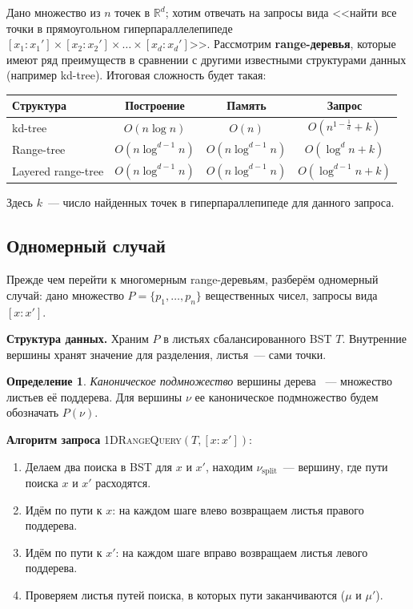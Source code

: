 \documentclass[12pt, a4paper]{article}
\theoremstyle{definition}
\newtheorem*{definition}{Определение}
\theoremstyle{plain}
\theoremstyle{remark}
\begin{document}
Дано множество из $n$ точек в $\mathbb{R}^d$; хотим отвечать на
запросы вида <<найти все точки в прямоугольном гиперпараллелепипеде $[x_1:x_1'] \times [x_2: x_2'] \times \ldots \times [x_d: x_d']$>>. Рассмотрим \textbf{range-деревья}, которые имеют ряд преимуществ в сравнении с другими известными структурами данных (например kd-tree). Итоговая сложность будет такая:

\begin{center}
\begin{tabular}{l|c|c|c}
Структура & Построение & Память & Запрос \\
\hline
kd-tree & $O(n\log n)$ & $O(n)$ & $O(n^{1-\frac{1}{d}}+k)$ \\
\hline
Range-tree & $O(n\log^{d-1} n)$ & $O(n\log^{d-1} n)$ & $O(\log^d n+k)$ \\
Layered range-tree & $O(n\log^{d-1} n)$ & $O(n\log^{d-1} n)$ & $O(\log^{d-1} n+k)$ \\
\end{tabular}
\end{center}

Здесь $k$~--- число найденных точек в гиперпараллепипеде для данного запроса.

\subsection{Одномерный случай}

Прежде чем перейти к многомерным range-деревьям, разберём одномерный случай: дано множество $P = \{p_1, \ldots, p_n\}$ вещественных чисел, запросы вида $[x : x']$.

\textbf{Структура данных.} Храним $P$ в листьях сбалансированного BST $T$. Внутренние вершины хранят значение для разделения, листья~--- сами точки.


\begin{definition}
    \textit{Каноническое подмножество} вершины дерева ~--- множество листьев её поддерева. Для вершины $\nu$ ее каноническое подмножество будем обозначать $P(\nu)$.
\end{definition}

\textbf{Алгоритм запроса} \textsc{1DRangeQuery}$(T, [x:x'])$:
\begin{enumerate}
    \item Делаем два поиска в BST для $x$ и $x'$, находим $\nu_{\mathrm{split}}$~--- вершину, где пути поиска $x$ и $x'$ расходятся.
    \item Идём по пути к $x$: на каждом шаге влево возвращаем листья правого поддерева.
    \item Идём по пути к $x'$: на каждом шаге вправо возвращаем листья левого поддерева.
    \item Проверяем листья путей поиска, в которых пути заканчиваются ($\mu$ и $\mu'$).
\end{enumerate}
\end{document}
